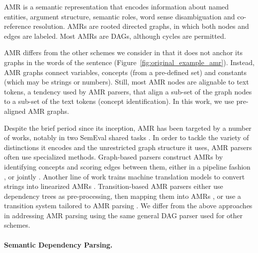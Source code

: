 \documentclass[11pt,a4paper]{article}
\begin{document}
AMR \cite{banarescu2013abstract} is a semantic representation that encodes information about named entities, 
argument structure, semantic roles, word sense disambiguation and co-reference resolution.
AMRs are rooted directed graphs, in which both nodes and edges are labeled.
Most AMRs are DAGs, although cycles are permitted.

AMR differs from the other schemes we consider in that it does not anchor its graphs
in the words of the sentence (Figure~\ref{fig:original_example_amr}). Instead, AMR graphs
connect variables, concepts (from a pre-defined set) and constants (which may be strings or numbers).
Still, most AMR nodes are alignable to text tokens, a tendency used by AMR parsers,
that align a sub-set of the graph nodes to a sub-set of the text tokens (concept identification). In this work, we use pre-aligned AMR graphs.

Despite the brief period since its inception, AMR has been targeted by a number of works,
notably in two SemEval shared tasks \cite{may2016semeval,may2017semeval}.
In order to tackle the variety of distinctions it encodes and the unrestricted graph structure
it uses, AMR parsers often use specialized methods.
Graph-based parsers construct AMRs
by identifying concepts and scoring edges between them, either in a pipeline fashion
\cite{flanigan2014discriminative,artzi2015broad,pust2015parsing,foland2017abstract},
or jointly \cite{zhou2016amr}.
Another line of work %
trains machine translation models to convert strings into linearized AMRs
\cite{barzdins2016riga,Gildea2017AddressingTD,Konstas2017NeuralAS,Buys2017RobustIN}.
Transition-based AMR parsers either 
use dependency trees as pre-processing, then mapping them into AMRs
\cite{wang-xue-pradhan:2015:ACL-IJCNLP,wang2015transition,wang-EtAl:2016:SemEval,goodman2016noise},
or use a transition system tailored to AMR parsing \cite{damonte-17,D17-1130}.
We differ from the above approaches in addressing AMR parsing 
using the same general DAG parser used for other schemes.


\paragraph{Semantic Dependency Parsing.}\label{sec:sdp}
\end{document}
